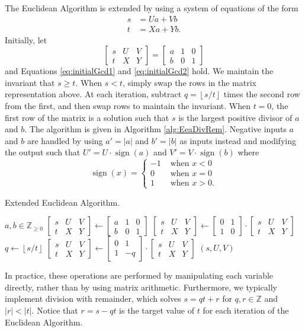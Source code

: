 \documentclass{ucalgthes1}
\theoremstyle{definition}
\DeclareMathOperator{\sign}{sign}
\newcommand{\ZZ}{\mathbb{Z}}
\newcommand{\ZZgez}{\mathbb{Z}_{\ge 0}}
\newcommand{\matrixtt}[4]{\left[ \begin{array}{rr} #1 & #2 \\ #3 & #4 \end{array} \right]}
\newcommand{\matrixThreeTwo}[6]{\left[ \begin{array}{rrr} #1 & #2 & #3 \\ #4 & #5 & #6 \end{array} \right]}
\newcommand{\floor}[1]{\left\lfloor #1 \right\rfloor}
\begin{document}
The Euclidean Algorithm is extended by using a system of equations of the form
\begin{align}
s &= Ua + Vb \label{eq:initialGcd1} \\
t &= Xa + Yb. \label{eq:initialGcd2}
\end{align}
Initially, let
\[
\matrixThreeTwo{s}{U}{V}{t}{X}{Y} = \matrixThreeTwo{a}{1}{0}{b}{0}{1}
\]
and Equations \ref{eq:initialGcd1} and \ref{eq:initialGcd2} hold.  We maintain the invariant that $s \ge t$.  When $s < t$, simply swap the rows in the matrix representation above.  At each iteration, subtract $q = \floor{s/t}$ times the second row from the first, and then swap rows to maintain the invariant.  When $t=0$, the first row of the matrix is a solution such that $s$ is the largest positive divisor of $a$ and $b$.  The algorithm is given in Algorithm \ref{alg:EeaDivRem}.  Negative inputs $a$ and $b$ are handled by using $a' = |a|$ and $b' = |b|$ as inputs instead and modifying the output such that $U' = U \cdot \sign(a)$ and $V' = V \cdot \sign(b)$ where
\[
	\sign(x) = \begin{cases}
		-1 & \textrm{ when } x < 0 \\
		0 & \textrm{ when } x = 0 \\
		1 & \textrm{ when } x > 0.
	\end{cases}
\]

\begin{algorithm}[h]
\caption{Extended Euclidean Algorithm.}
\label{alg:EeaDivRem}
\begin{algorithmic}[1]
\REQUIRE $a,b \in \ZZgez$
\STATE $\matrixThreeTwo{s}{U}{V}{t}{X}{Y} \gets 
        \matrixThreeTwo{a}{1}{0}{b}{0}{1}$
	\STATE $\matrixThreeTwo{s}{U}{V}{t}{X}{Y} \gets
	        \matrixtt{0}{1}{1}{0} \cdot \matrixThreeTwo{s}{U}{V}{t}{X}{Y}$
\ENDIF
{}
	\STATE $q \gets \floor{s / t}$
	\STATE $\matrixThreeTwo{s}{U}{V}{t}{X}{Y} \gets \matrixtt{0}{1}{1}{-q} \cdot
		    \matrixThreeTwo{s}{U}{V}{t}{X}{Y}$ 
\ENDWHILE
\RETURN $(s, U, V)$ 
\end{algorithmic}
\end{algorithm}

In practice, these operations are performed by manipulating each variable directly, rather than by using matrix arithmetic.  Furthermore, we typically implement division with remainder, which solves $s = qt + r$ for $q,r \in \ZZ$ and $|r| < |t|$.  Notice that $r = s - qt$ is the target value of $t$ for each iteration of the Euclidean Algorithm.
\end{document}
